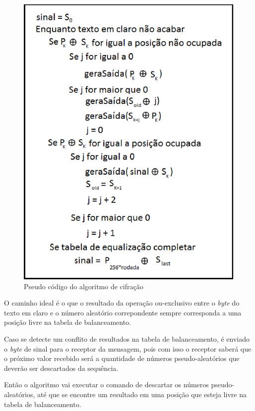 \begin{figure}[h]
	\centering
	\includegraphics[scale=1]{figuras/pseudocondigo.eps}
	\caption{Pseudo código do algoritmo de cifração}
	\label{pseudo-codigo}
\end{figure}

O caminho ideal é o que o resultado da operação ou-exclusivo entre o \textit{byte} do texto em claro e o número aleatório correpondente sempre corresponda a uma posição livre na tabela de balanceamento.

Caso se detecte um conflito de resultados na tabela de balanceamento, é enviado o \textit{byte} de sinal para o receptor da mensagem, pois com isso o receptor saberá que o próximo valor recebido será a quantidade de números pseudo-aleatórios que deverão ser descartados da sequência. 

Então o algoritmo vai executar o comando de descartar os números pseudo-aleatórios, até que se encontre um resultado em uma posição que esteja livre na tabela de balanceamento. 

